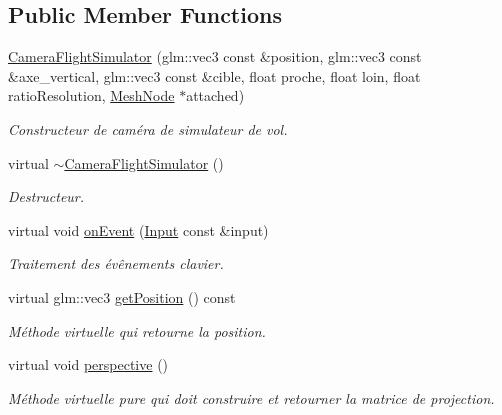 \subsection*{Public Member Functions}
\begin{DoxyCompactItemize}
\item 
\hypertarget{classCameraFlightSimulator_a13b192b01617281f3dcf9b7acb8e0d44}{\hyperlink{classCameraFlightSimulator_a13b192b01617281f3dcf9b7acb8e0d44}{Camera\-Flight\-Simulator} (glm\-::vec3 const \&position, glm\-::vec3 const \&axe\-\_\-vertical, glm\-::vec3 const \&cible, float proche, float loin, float ratio\-Resolution, \hyperlink{classMeshNode}{Mesh\-Node} $\ast$attached)}\label{classCameraFlightSimulator_a13b192b01617281f3dcf9b7acb8e0d44}

\begin{DoxyCompactList}\small\item\em Constructeur de caméra de simulateur de vol. \end{DoxyCompactList}\item 
\hypertarget{classCameraFlightSimulator_aa83f01c1f64fd6fbf56c341866cb62f8}{virtual \hyperlink{classCameraFlightSimulator_aa83f01c1f64fd6fbf56c341866cb62f8}{$\sim$\-Camera\-Flight\-Simulator} ()}\label{classCameraFlightSimulator_aa83f01c1f64fd6fbf56c341866cb62f8}

\begin{DoxyCompactList}\small\item\em Destructeur. \end{DoxyCompactList}\item 
\hypertarget{classCameraFlightSimulator_ae8ea1ed382e1dfdde4f53ad654c503f5}{virtual void \hyperlink{classCameraFlightSimulator_ae8ea1ed382e1dfdde4f53ad654c503f5}{on\-Event} (\hyperlink{classInput}{Input} const \&input)}\label{classCameraFlightSimulator_ae8ea1ed382e1dfdde4f53ad654c503f5}

\begin{DoxyCompactList}\small\item\em Traitement des évênements clavier. \end{DoxyCompactList}\item 
\hypertarget{classCameraFlightSimulator_ab624dcd6b9110c82980ec2d04786da6d}{virtual glm\-::vec3 \hyperlink{classCameraFlightSimulator_ab624dcd6b9110c82980ec2d04786da6d}{get\-Position} () const }\label{classCameraFlightSimulator_ab624dcd6b9110c82980ec2d04786da6d}

\begin{DoxyCompactList}\small\item\em Méthode virtuelle qui retourne la position. \end{DoxyCompactList}\item 
\hypertarget{classCameraFlightSimulator_a70d900c0f14c3193b9af612ad8f48249}{virtual void \hyperlink{classCameraFlightSimulator_a70d900c0f14c3193b9af612ad8f48249}{perspective} ()}\label{classCameraFlightSimulator_a70d900c0f14c3193b9af612ad8f48249}

\begin{DoxyCompactList}\small\item\em Méthode virtuelle pure qui doit construire et retourner la matrice de projection. \end{DoxyCompactList}\end{DoxyCompactItemize}
